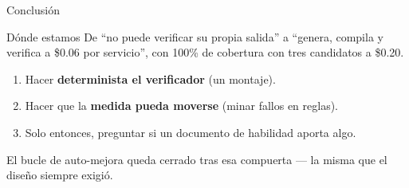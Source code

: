 \documentclass[aspectratio=169,11pt]{beamer}
\begin{document}
\begin{frame}{Conclusión}
  \begin{block}{Dónde estamos}
    De ``no puede verificar su propia salida'' a ``genera, compila y verifica a
    \$0.06 por servicio'', con 100\% de cobertura con tres candidatos a \$0.20.
  \end{block}
  \begin{enumerate}
    \item Hacer \textbf{determinista el verificador} (un montaje).
    \item Hacer que la \textbf{medida pueda moverse} (minar fallos en reglas).
    \item Solo entonces, preguntar si un documento de habilidad aporta algo.
  \end{enumerate}
  El bucle de auto-mejora queda cerrado tras esa compuerta --- la misma que el diseño
  siempre exigió.
\end{frame}
\end{document}
